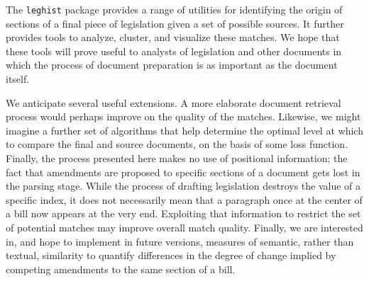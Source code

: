 \documentclass[11pt]{article}
\begin{document}
The \texttt{leghist} package provides a range of utilities for
identifying the origin of sections of a final piece of legislation
given a set of possible sources. It further provides tools to analyze,
cluster, and visualize these matches. We hope that these tools will
prove useful to analysts of legislation and other documents in which
the process of document preparation is as important as the document
itself. 

We anticipate several useful extensions. A more elaborate document
retrieval process would perhaps improve on the quality of the
matches. Likewise, we might imagine a further set of algorithms that
help determine the optimal level at which to compare the final and
source documents, on the basis of some loss function. Finally, the
process presented here makes no use of positional information; the
fact that amendments are proposed to specific sections of a document
gets lost in the parsing stage. While the process of drafting
legislation destroys the value of a specific index, it does not
necessarily mean that a paragraph once at the center of a bill now
appears at the very end. Exploiting that information to restrict the
set of potential matches may improve overall match quality. Finally,
we are interested in, and hope to implement in future versions,
measures of semantic, rather than textual, similarity to quantify
differences in the degree of change implied by competing amendments to
the same section of a bill. 





\end{document}
